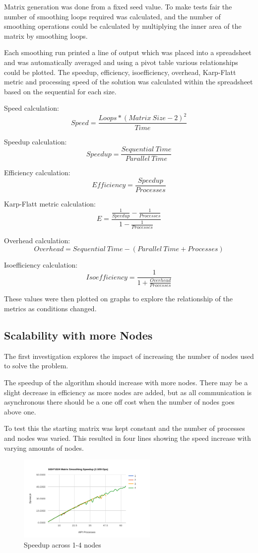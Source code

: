 \documentclass[a4paper,10pt]{report}
\begin{document}
Matrix generation was done from a fixed seed value. To make tests fair the number of smoothing loops required was calculated, and the number of smoothing operations could be calculated by multiplying the inner area of the matrix by smoothing loops.

Each smoothing run printed a line of output which was placed into a spreadsheet and was automatically averaged and using a pivot table various relationships could be plotted. The speedup, efficiency, isoefficiency, overhead, Karp-Flatt metric and processing speed of the solution was calculated within the spreadsheet based on the sequential for each size.

Speed calculation: $$Speed = \frac{Loops * (Matrix\ Size - 2)^2}{Time}$$

Speedup calculation: $$Speedup = \frac{Sequential\ Time}{Parallel\ Time}$$

Efficiency calculation: $$Efficiency = \frac{Speedup}{Processes}$$

Karp-Flatt metric calculation: $$E = \frac{\frac{1}{Speedup} - \frac{1}{Processes}}{1 - \frac{1}{Processes}}$$

Overhead calculation: $$Overhead = Sequential\ Time - (Parallel\ Time + Processes)$$

Isoefficiency calculation: $$Isoefficiency = \frac{1}{1 + \frac{Overhead}{Processes}}$$

These values were then plotted on graphs to explore the relationship of the metrics as conditions changed.
\subsection{Scalability with more Nodes}
The first investigation explores the impact of increasing the number of nodes used to solve the problem.

The speedup of the algorithm should increase with more nodes. There may be a slight decrease in efficiency as more nodes are added, but as all communication is asynchronous there should be a one off cost when the number of nodes goes above one.

To test this the starting matrix was kept constant and the number of processes and nodes was varied. This resulted in four lines showing the speed increase with varying amounts of nodes.

\begin{figure}
 \centering
 \includegraphics[width=0.6\textwidth]{./images/nodes-speedup.png}
 \caption{Speedup across 1-4 nodes}
 \label{fig:nodespeedup}
\end{figure}
\end{document}
